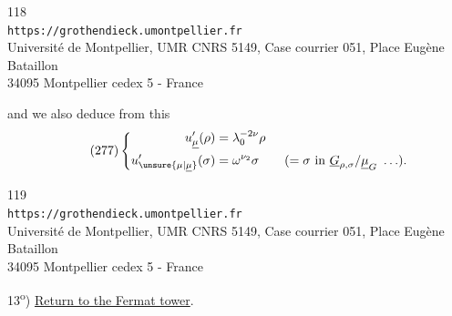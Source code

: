 
\begin{center}
\small
118\\
\texttt{https://grothendieck.umontpellier.fr}\\
Université de Montpellier, UMR CNRS 5149, Case courrier 051, Place Eugène Bataillon\\
34095 Montpellier cedex 5 - France
\end{center}


and we also deduce from this
\[
\tag{277}
\left\{
\begin{aligned}
u'_{\underline{\mu}}(\rho)&=\lambda_0^{-2\nu}\rho\\
u'_{\unsure{\mu|\underline{\mu}}}(\sigma)&=\omega^{\nu_2}\sigma
\qquad (=\sigma\text{ in }\underline G_{\rho,\sigma}/\underline{\mu}_G\ \ldots).
\end{aligned}
\right.
\]


\begin{center}
\small
119\\
\texttt{https://grothendieck.umontpellier.fr}\\
Université de Montpellier, UMR CNRS 5149, Case courrier 051, Place Eugène Bataillon\\
34095 Montpellier cedex 5 - France
\end{center}


13\textsuperscript{o}) \uline{Return to the Fermat tower}.

